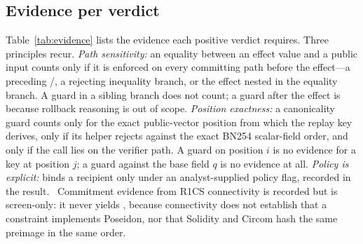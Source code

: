 \subsection{Evidence per verdict}\label{sec:design-evidence}

Table~\ref{tab:evidence} lists the evidence each positive verdict requires.
Three principles recur.
\emph{Path sensitivity:} an equality between an effect value and a public input
counts only if it is enforced on every committing path before the effect---a
preceding /, a rejecting inequality branch, or the
effect nested in the equality branch. A guard in a sibling branch does not
count; a guard after the effect is \UNK{} because rollback reasoning is out of
scope.
\emph{Position exactness:} a canonicality guard counts only for the exact
public-vector position from which the replay key derives, only if its helper
rejects against the exact BN254 scalar-field order, and only if the call lies on
the verifier path. A guard on position $i$ is no evidence for a key at
position $j$; a guard against the base field $q$ is no evidence at all.
\emph{Policy is explicit:}  binds a recipient only under an
analyst-supplied  policy flag, recorded in the
result.%
\
Commitment evidence from R1CS connectivity is recorded but is screen-only: it
never yields \VWS{}, because connectivity does not establish that a
constraint implements Poseidon, nor that Solidity and Circom hash the same
preimage in the same order.

